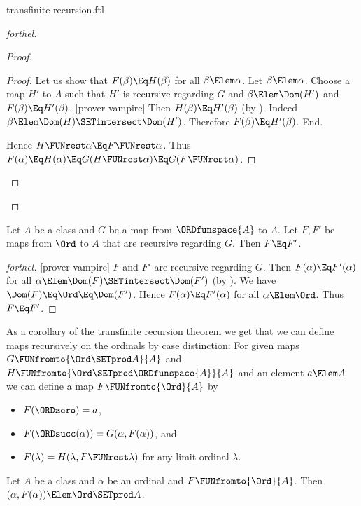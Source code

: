 \documentclass{stex}
\begin{document}
\begin{smodule}{transfinite-recursion.ftl}
\begin{proof}[forthel]
\begin{proof}
\begin{proof}
      Let us show that $F(\beta) \Eq H(\beta)$ for all $\beta \Elem \alpha$.
        Let $\beta \Elem \alpha$.
        Choose a map $H'$ to $A$ such that $H'$ is recursive regarding $G$ and $\beta \Elem \Dom(H')$ and $F(\beta) \Eq H'(\beta)$.
        [prover vampire]
        Then $H(\beta) \Eq H'(\beta)$ (by ).
        Indeed $\beta \Elem \Dom(H) \SETintersect \Dom(H')$.
        Therefore $F(\beta) \Eq H'(\beta)$.
      End.

      Hence $H \FUNrest \alpha \Eq F \FUNrest \alpha$.
      Thus $F(\alpha)
        \Eq H(\alpha)
        \Eq G(H \FUNrest \alpha)
        \Eq G(F \FUNrest \alpha)$.
    \end{proof}
  \end{proof}
\end{proof}

\begin{theorem}[forthel,title=Transfinite Recursion: Uniqueness]
  Let $A$ be a class and $G$ be a map from $\ORDfunspace{A}$ to $A$.
  Let $F, F'$ be maps from $\Ord$ to $A$ that are recursive regarding $G$.
  Then $F \Eq F'$.
\end{theorem}
\begin{proof}[forthel]
  [prover vampire]
  $F$ and $F'$ are recursive regarding $G$.
  Then $F(\alpha) \Eq F'(\alpha)$ for all $\alpha \Elem \Dom(F) \SETintersect \Dom(F')$ (by ).
  We have $\Dom(F) \Eq \Ord \Eq \Dom(F')$.
  Hence $F(\alpha) \Eq F'(\alpha)$ for all $\alpha \Elem \Ord$.
  Thus $F \Eq F'$.
\end{proof}

As a corollary of the transfinite recursion theorem we get that we can
define maps recursively on the ordinals by case distinction:
For given maps $G \FUNfromto{\Ord \SETprod A}{A}$ and
$H \FUNfromto{\Ord \SETprod \ORDfunspace{A}}{A}$ and an element $a \Elem A$ we
can define a map $F \FUNfromto{\Ord}{A}$ by
\begin{itemize}
  \item $F(\ORDzero) = a$,
  \item $F(\ORDsucc(\alpha)) = G(\alpha, F(\alpha))$, and
  \item $F(\lambda) = H(\lambda, F \FUNrest \lambda)$
    for any limit ordinal $\lambda$.
\end{itemize}

\begin{lemma}[forthel]
  Let $A$ be a class and $\alpha$ be an ordinal and $F \FUNfromto{\Ord}{A}$.
  Then $(\alpha, F(\alpha)) \Elem \Ord \SETprod A$.
\end{lemma}


\end{smodule}
\end{document}
